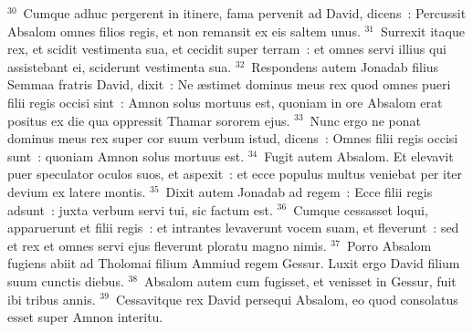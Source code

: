 ${}^{30}$~Cumque adhuc pergerent in itinere, fama pervenit ad David, dicens~: Percussit Absalom omnes filios regis, et non remansit ex eis saltem unus.
${}^{31}$~Surrexit itaque rex, et scidit vestimenta sua, et cecidit super terram~: et omnes servi illius qui assistebant ei, sciderunt vestimenta sua.
${}^{32}$~Respondens autem Jonadab filius Semmaa fratris David, dixit~: Ne \ae stimet dominus meus rex quod omnes pueri filii regis occisi sint~: Amnon solus mortuus est, quoniam in ore Absalom erat positus ex die qua oppressit Thamar sororem ejus.
${}^{33}$~Nunc ergo ne ponat dominus meus rex super cor suum verbum istud, dicens~: Omnes filii regis occisi sunt~: quoniam Amnon solus mortuus est.
${}^{34}$~Fugit autem Absalom. Et elevavit puer speculator oculos suos, et aspexit~: et ecce populus multus veniebat per iter devium ex latere montis.
${}^{35}$~Dixit autem Jonadab ad regem~: Ecce filii regis adsunt~: juxta verbum servi tui, sic factum est.
${}^{36}$~Cumque cessasset loqui, apparuerunt et filii regis~: et intrantes levaverunt vocem suam, et fleverunt~: sed et rex et omnes servi ejus fleverunt ploratu magno nimis.
${}^{37}$~Porro Absalom fugiens abiit ad Tholomai filium Ammiud regem Gessur. Luxit ergo David filium suum cunctis diebus.
${}^{38}$~Absalom autem cum fugisset, et venisset in Gessur, fuit ibi tribus annis.
${}^{39}$~Cessavitque rex David persequi Absalom, eo quod consolatus esset super Amnon interitu.

